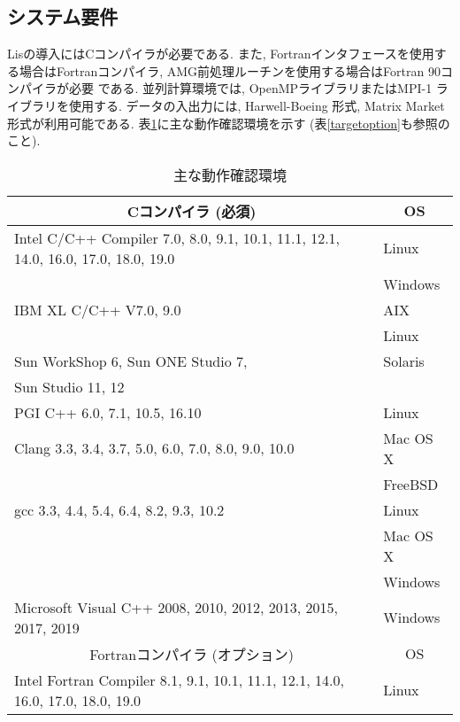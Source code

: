 \documentclass[a4paper]{jarticle}
\begin{document}
\subsection{システム要件}
Lisの導入にはCコンパイラが必要である. 
また, Fortranインタフェースを使用する場合はFortranコンパイラ, 
AMG前処理ルーチンを使用する場合はFortran 90コンパイラが必要
である. 並列計算環境では, OpenMPライブラリ\cite{OpenMP}またはMPI-1
ライブラリ\cite{MPI}を使用する\cite{kota1,kota2}. 
データの入出力には, Harwell-Boeing 
形式\cite{duff92}, Matrix Market形式\cite{matrixmarket}が利用可能である. 
表\ref{platforms}に主な動作確認環境を示す
 (表\ref{targetoption}も参照のこと). 

\begin{table}[htbp]
\caption{主な動作確認環境}
\label{platforms}
\begin{center}
{\small
 \begin{tabular}{l|l}
\hline
\multicolumn{1}{c|}{Cコンパイラ (必須) } & \multicolumn{1}{c}{OS} \\
\hline
Intel C/C++ Compiler 7.0, 8.0, 9.1, 10.1, 11.1, 12.1, 14.0, 16.0, 17.0, 18.0, 19.0 & Linux \\
                                                     & Windows  \\
\hline
IBM XL C/C++ V7.0, 9.0                     & AIX   \\
                                           & Linux \\
\hline
Sun WorkShop 6, Sun ONE Studio 7,          & Solaris \\
Sun Studio 11, 12                          &         \\
\hline
PGI C++ 6.0, 7.1, 10.5, 16.10              & Linux \\
\hline
Clang 3.3, 3.4, 3.7, 5.0, 6.0, 7.0, 8.0, 9.0, 10.0 & Mac OS X \\
                                           & FreeBSD \\
\hline
gcc 3.3, 4.4, 5.4, 6.4, 8.2, 9.3, 10.2     & Linux \\
                                           & Mac OS X \\
                                           & Windows \\
\hline
Microsoft Visual C++ 2008, 2010, 2012, 2013, 2015, 2017, 2019 & Windows \\
\hline
\hline
\multicolumn{1}{c|}{Fortranコンパイラ (オプション) } & \multicolumn{1}{c}{OS} \\
\hline
Intel Fortran Compiler 8.1, 9.1, 10.1, 11.1, 12.1, 14.0, 16.0, 17.0, 18.0, 19.0 & Linux \\

\end{tabular}}
\end{center}
\end{table}
\end{document}
